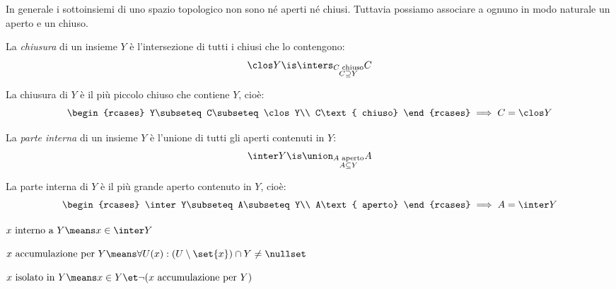 
In generale i sottoinsiemi di uno spazio topologico non sono né aperti né chiusi. Tuttavia possiamo associare a ognuno in modo naturale un aperto e un chiuso.

\begin{defn}[Chiusura]
	La \emph{chiusura} di un insieme $Y$ è l'intersezione di tutti i chiusi che lo contengono:
	\[\clos Y\is\inters_{\substack{C\text{ chiuso}\\C\supseteq Y}}C\]
\end{defn}

\begin{prop}
	La chiusura di $Y$ è il più piccolo chiuso che contiene $Y$, cioè:
	\[\begin{rcases}
		Y\subseteq C\subseteq\clos Y\\
		C\text{ chiuso}
	\end{rcases}\implies C=\clos Y\]
\end{prop}

\begin{defn}
	La \emph{parte interna} di un insieme $Y$ è l'unione di tutti gli aperti contenuti in $Y$:
	\[\inter Y\is\union_{\substack{A\text{ aperto}\\A\subseteq Y}}A\]
\end{defn}

\begin{prop}
	La parte interna di $Y$ è il più grande aperto contenuto in $Y$, cioè:
	\[\begin{rcases}
		\inter Y\subseteq A\subseteq Y\\
		A\text{ aperto}
	\end{rcases}\implies A=\inter Y\]
\end{prop}

\begin{defn}
$x\text{ interno a }Y\means x\in\inter Y$
\end{defn}

\begin{defn}
$x\text{ accumulazione per }Y\means\forall U(x):(U\setminus\set{x})\cap Y\neq\nullset$
\end{defn}

\begin{defn}
$x\text{ isolato in }Y\means x\in Y\et\neg(x\text{ accumulazione per }Y)$
\end{defn}

